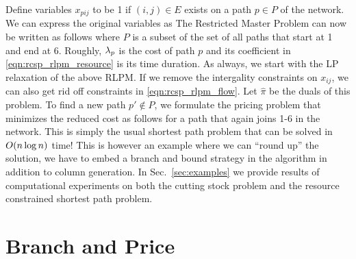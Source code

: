 \documentclass[letterpaper, 10pt, twocolumn, reqno]{amsart}
\begin{document}
Define variables $x_{pij}$ to be 1 if $(i,j) \in E$ exists on a path $p \in P$ of the network. We can express the original variables as
The Restricted Master Problem can now be written as follows
where $P$ is a subset of the set of all paths that start at 1 and end at 6.
Roughly, $\lambda_p$ is the cost of path $p$ and its coefficient in \eqref{eqn:rcsp_rlpm_resource} is its time duration. As always, we start with the LP
relaxation of the above RLPM. If we remove the intergality constraints on $x_{ij}$, we can also get rid off constraints in \eqref{eqn:rcsp_rlpm_flow}. Let $\hat{\pi}$ be the duals of this problem. To find a new path $p' \notin P$, we formulate the pricing problem that minimizes the reduced cost as follows
for a path that again joins 1-6 in the network. This is simply the usual shortest path problem that can be solved in $O(n \log n)$ time! This is however an example where we can ``round up'' the solution, we have to embed a branch and bound strategy in the algorithm in addition to column generation. In Sec.~\ref{sec:examples} we provide results of computational experiments on both the cutting stock problem and the resource constrained shortest path problem.

\section{Branch and Price}
\label{sec:branch_and_price}
\end{document}

